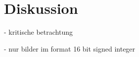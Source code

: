 \chapter{Diskussion}
\label{chap:diskussion} - kritische betrachtung

- nur bilder im format 16 bit signed integer